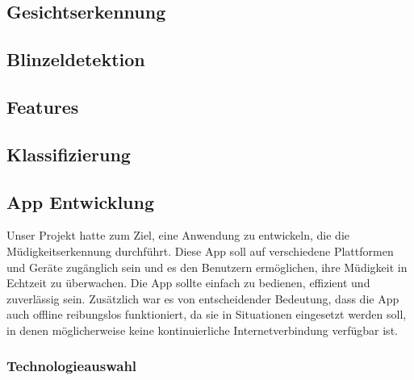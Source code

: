 \subsection{Gesichtserkennung}
\label{sec:facedetection}

\subsection{Blinzeldetektion}
\label{sec:blinkdetection}

\subsection{Features}
\label{sec:features}

\subsection{Klassifizierung}
\label{sec:classification}

\subsection{App Entwicklung}
\label{ssec:appEntwicklung}
	Unser Projekt hatte zum Ziel, eine Anwendung zu entwickeln, die die Müdigkeitserkennung durchführt. Diese App soll auf verschiedene Plattformen und Geräte zugänglich sein und es den Benutzern ermöglichen, ihre Müdigkeit in Echtzeit zu überwachen. Die App sollte einfach zu bedienen, effizient und zuverlässig sein. Zusätzlich war es von entscheidender Bedeutung, dass die App auch offline reibungslos funktioniert, da sie in Situationen eingesetzt werden soll, in denen möglicherweise keine kontinuierliche Internetverbindung verfügbar ist.
	
	\subsubsection{Technologieauswahl}
	\label{sssec:technologie}
		
